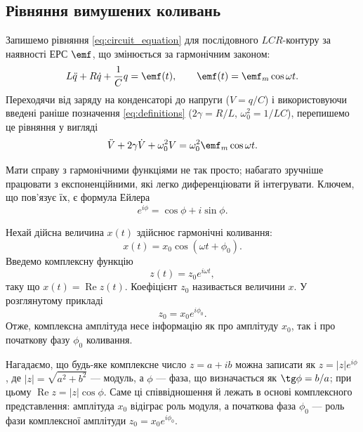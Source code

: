 \subsection*{Рівняння вимушених коливань}

Запишемо рівняння \eqref{eq:circuit_equation} для послідовного $LCR$-контуру за наявності ЕРС $\emf$,
що змінюється за гармонічним законом:
\begin{equation}\label{eq:forced_equation}
	L\ddot{q} + R\dot{q} + \frac{1}{C}q = \emf(t), \qquad
	\emf(t) = \emf_m \cos\omega t.
\end{equation}
Переходячи від заряду на конденсаторі до напруги ($V = q/C$) і використовуючи введені раніше позначення \eqref{eq:definitions} ($2\gamma = R/L$, $\omega_0^2 = 1/LC$), перепишемо це рівняння у вигляді
\begin{equation}\label{eq:forced_equation_V}
	\ddot{V} + 2\gamma\dot{V} + \omega_0^2 V = \omega_0^2 \emf_m \cos\omega t.
\end{equation}

\begin{Attention}
	Мати справу з гармонічними функціями не так просто; набагато зручніше працювати з експоненційними, які легко диференціювати й інтегрувати. Ключем, що пов'язує їх, є формула Ейлера
	\begin{equation*}
		e^{i\phi} = \cos\phi + i\sin\phi.
	\end{equation*}

	Нехай дійсна величина $x(t)$ здійснює гармонічні коливання:
	\begin{equation}\label{eq:harmonic_real}
		x(t) = x_0 \cos(\omega t + \phi_0).
	\end{equation}
	Введемо комплексну функцію
	\begin{equation}\label{eq:complex_function}
		z(t) = z_0 e^{i\omega t},
	\end{equation}
	таку що $x(t) = \operatorname{Re} z(t)$. Коефіцієнт $z_0$ називається  величини $x$. У розглянутому прикладі
	\begin{equation}\label{eq:complex_amplitude}
		z_0 = x_0 e^{i\phi_0}.
	\end{equation}
	Отже, комплексна амплітуда несе інформацію як про амплітуду $x_0$, так і про початкову фазу $\phi_0$ коливання.

	Нагадаємо, що будь-яке комплексне число $z = a + ib$ можна записати як $z = |z| e^{i\phi}$, де $|z| = \sqrt{a^2 + b^2}$ --- модуль, а $\phi$ --- фаза, що визначається як $\tg\phi = b/a$; при цьому $\operatorname{Re} z = |z|\cos\phi$. Саме ці співвідношення й лежать в основі комплексного представлення: амплітуда $x_0$ відіграє роль модуля, а початкова фаза $\phi_0$ --- роль фази комплексної амплітуди $z_0 = x_0 e^{i\phi_0}$.
\end{Attention}

